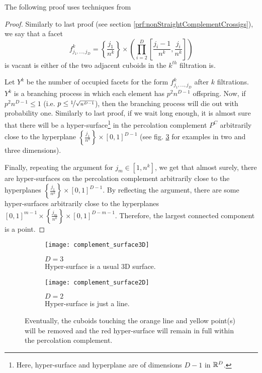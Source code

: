The following proof uses techniques from \cite[p.310 b.(2)]{Chayes_1988}
\begin{proof}
	Similarly to last proof (see section \ref{prf:nonStraightComplementCrossigs}), we say that a facet 
	$$f_{j_1,\dots,j_D}^k = \left\lbrace \frac{j_1}{n^k} \right\rbrace \times \left( \prod_{i=2}^{D} \left[ \frac{j_i-1}{n^k},\frac{j_i}{n^k} \right] \right) $$
	is vacant is either of the two adjacent cuboids in the $k^{th}$ filtration is.
	
	Let $Y^k$ be the number of occupied facets for the form $f_{j_1,\dots,j_D}^k$ after $k$ filtrations.
	$Y^k$ is a branching process in which each element has $p^2n^{D-1}$ offspring.
	Now, if $p^2n^{D-1}	\leq 1$ (i.e. $p \leq \nicefrac{1}{\sqrt{n^{D-1}}}$), then the branching process will die out with probability one.
	Similarly to last proof, if we wait long enough, it is almost sure that there will be a hyper-surface\footnote{Here, hyper-surface and hyperplane are of dimensions $D-1$ in $\mathbb{R}^D$.} in the percolation complement $P^C$ arbitrarily close to the hyperplane $\left\lbrace \frac{j_1}{n^k} \right\rbrace \times \left[ 0,1 \right]^{D-1}$ (see fig. \ref{fig:complementSurface} for examples in two and three dimensions).
	
	Finally, repeating the argument for $j_m \in \left[ 1,n^k\right] $, we get that almost surely, there are hyper-surfaces on the percolation complement arbitrarily close to the hyperplanes $\left\lbrace \frac{j_1}{n^k} \right\rbrace \times \left[ 0,1 \right]^{D-1}$.
	By reflecting the argument, there are some hyper-surfaces arbitrarily close to the hyperplanes $\left[ 0,1 \right]^{m-1} \times \left\lbrace \frac{j_m}{n^k} \right\rbrace \times \left[ 0,1 \right]^{D-m-1}$.
	Therefore, the largest connected component is a point.
\end{proof}

\begin{figure}[!h]
	\vspace{-0.75cm}
	\begin{subfigure}{0.44\linewidth}
		\texttt{[image: complement\_surface3D]}
		\centering
		\captionsetup{justification=centering}
		\caption{$D = 3$\\Hyper-surface is a usual 3D surface.}
		\label{fig:complementSurface3D}
	\end{subfigure}
	\hspace{0.1\linewidth}
	\begin{subfigure}{0.44\linewidth}
		\texttt{[image: complement\_surface2D]}
		\centering
		\captionsetup{justification=centering}
		\caption{$D = 2$\\Hyper-surface is just a line.}
		\label{fig:complementSurface2D}
	\end{subfigure}
	\centering
	\caption{Eventually, the cuboids touching the orange line and yellow point(s) will be removed and the red hyper-surface will remain in full within the percolation complement.}
	\label{fig:complementSurface}
\end{figure}

